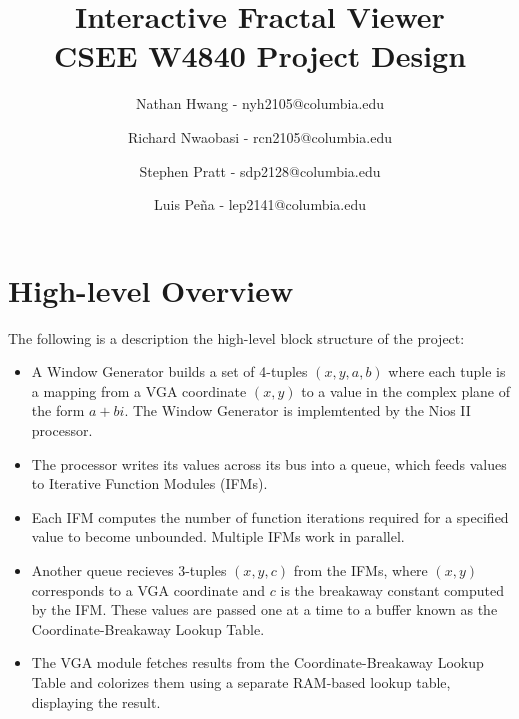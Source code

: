 \documentclass{article}
\begin{document}
\title{Interactive Fractal Viewer \\
CSEE W4840 Project Design}
\author{Nathan Hwang - nyh2105@columbia.edu \and
Richard Nwaobasi - rcn2105@columbia.edu \and
Stephen Pratt - sdp2128@columbia.edu \and
Luis Pe\~{n}a - lep2141@columbia.edu}
\maketitle
\newpage
{}




\section{High-level Overview}

The following is a description the high-level block structure of the project:

\begin{itemize}
\item A Window Generator builds a set of 4-tuples $(x, y, a, b)$ where
  each tuple is a mapping from a VGA coordinate $(x, y)$ to a value in
  the complex plane of the form $a+bi$. The Window Generator is
  implemtented by the Nios II processor.
\item The processor writes its values across its bus into a queue,
  which feeds values to Iterative Function Modules (IFMs).
\item Each IFM computes the number of function iterations required for
  a specified value to become unbounded. Multiple IFMs work in
  parallel.
\item Another queue recieves 3-tuples $(x, y, c)$ from the IFMs, where
  $(x, y)$ corresponds to a VGA coordinate and $c$ is the breakaway
  constant computed by the IFM. These values are passed one at a time
  to a buffer known as the Coordinate-Breakaway Lookup Table.
\item The VGA module fetches results from the Coordinate-Breakaway
  Lookup Table and colorizes them using a separate RAM-based lookup
  table, displaying the result.
\end{itemize}
\end{document}
